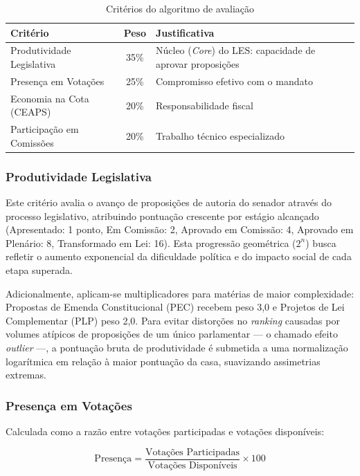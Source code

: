 \begin{table}[H]
\centering
\caption{Critérios do algoritmo de avaliação}
\label{tab:criterios}
\begin{tabular}{|l|c|p{7.5cm}|}
\hline
\textbf{Critério} & \textbf{Peso} & \textbf{Justificativa} \\
\hline
Produtividade Legislativa & 35\% & Núcleo (\textit{Core}) do LES: capacidade de aprovar proposições \\
Presença em Votações & 25\% & Compromisso efetivo com o mandato \\
Economia na Cota (CEAPS) & 20\% & Responsabilidade fiscal \\
Participação em Comissões & 20\% & Trabalho técnico especializado \\
\hline
\end{tabular}
\end{table}

\subsubsection{Produtividade Legislativa}

Este critério avalia o avanço de proposições de autoria do senador através do processo legislativo, atribuindo pontuação crescente por estágio alcançado (Apresentado: 1 ponto, Em Comissão: 2, Aprovado em Comissão: 4, Aprovado em Plenário: 8, Transformado em Lei: 16). Esta progressão geométrica ($2^n$) busca refletir o aumento exponencial da dificuldade política e do impacto social de cada etapa superada.

Adicionalmente, aplicam-se multiplicadores para matérias de maior complexidade: Propostas de Emenda Constitucional (PEC) recebem peso 3,0 e Projetos de Lei Complementar (PLP) peso 2,0. Para evitar distorções no \textit{ranking} causadas por volumes atípicos de proposições de um único parlamentar --- o chamado efeito \textit{outlier} ---, a pontuação bruta de produtividade é submetida a uma normalização logarítmica em relação à maior pontuação da casa, suavizando assimetrias extremas.

\subsubsection{Presença em Votações}

Calculada como a razão entre votações participadas e votações disponíveis:

\begin{equation}
\text{Presença} = \frac{\text{Votações Participadas}}{\text{Votações Disponíveis}} \times 100
\end{equation}

